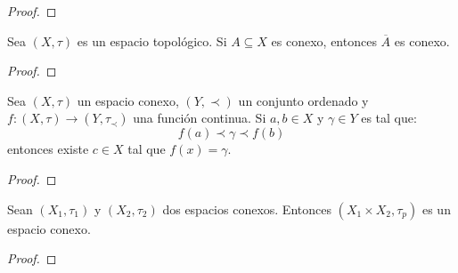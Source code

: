 \documentclass[12pt]{report}
\theoremstyle{largebreak}
\newcommand\cf[3]{\ensuremath{#1:#2\rightarrow#3}}
\newcommand{\Cls}[1]{\ensuremath{\overline{#1}}}
\begin{document}
    \begin{proof}
        
    \end{proof}

    \begin{cor}
        Sea $(X,\tau)$ es un espacio topológico. Si $A\subseteq X$ es conexo, entonces $\Cls{A}$ es conexo.  
    \end{cor}

    \begin{proof}
        
    \end{proof}

    \begin{theor}
        Sea $(X,\tau)$ un espacio conexo, $(Y,\prec)$ un conjunto ordenado y $\cf{f}{(X,\tau)}{(Y,\tau_\prec)}$ una función continua. Si $a,b\in X$ y $\gamma\in Y$ es tal que:
        \begin{equation*}
            f(a)\prec \gamma\prec f(b)
        \end{equation*}
        entonces existe $c\in X$ tal que $f(x)=\gamma$.
    \end{theor}

    \begin{proof}
        
    \end{proof}

    \begin{propo}
        Sean $(X_1,\tau_1)$ y $(X_2,\tau_2)$ dos espacios conexos. Entonces $(X_1\times X_2,\tau_p )$ es un espacio conexo.
    \end{propo}

    \begin{proof}
        
    \end{proof}
\end{document}
